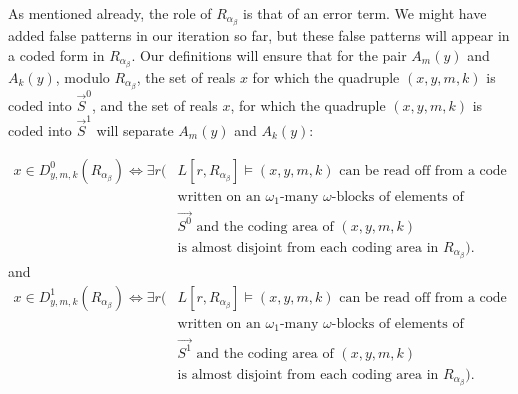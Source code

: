 \documentclass[a4paper,11pt]{article}
\begin{document}
As mentioned already, the role of $R_{\alpha_{\beta}}$ is that of an error term. We might have added false patterns in our iteration so far, but these false patterns will appear in a coded form in $R_{\alpha_{\beta}}$.  Our definitions will ensure that for the pair $A_m(y)$ and $A_k(y)$, modulo $R_{\alpha_{\beta}}$, the set of reals $x$ for which the quadruple $(x,y,m,k)$ is coded into $\vec{S}^0$, and the set of reals $x$, for which the quadruple $(x,y,m,k)$ is  coded into $\vec{S}^1$ will separate $A_m(y)$ and $A_k(y)$:



\begin{align*}
x \in D^0_{y,m,k} (R_{\alpha_{\beta}})\Leftrightarrow \exists r (&L[r, R_{\alpha_{\beta}}]  \models (x,y,m,k) \text{ can be read off from a code} \\& \text{written on an } \omega_1\text{-many $\omega$-blocks of elements of } \\& \vec{S^0} \text{ and the coding area of $(x,y,m,k)$} \\& \text{is almost disjoint from each coding area in $R_{\alpha_{\beta}}$} ).
\end{align*}
and
\begin{align*}
x \in D^1_{y,m,k} (R_{\alpha_{\beta}})\Leftrightarrow \exists r(&L[r, R_{\alpha_{\beta}}]  \models (x,y,m,k) \text{ can be read off from a code} \\& \text{written on an } \omega_1\text{-many $\omega$-blocks of elements of } \\& \vec{S^1} \text{ and the coding area of $(x,y,m,k)$} \\& \text{is almost disjoint from each coding area in $R_{\alpha_{\beta}}$} ).
\end{align*}
\end{document}

